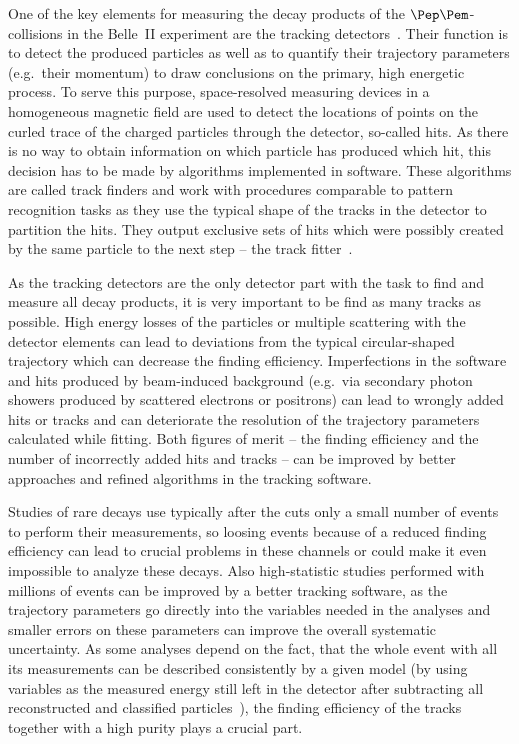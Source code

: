 One of the key elements for measuring the decay products of the $\Pep\Pem$-collisions in the Belle~II experiment are the tracking detectors~\cite{tdr}. Their function is to detect the produced particles as well as to quantify their trajectory parameters (e.g.\ their momentum) to draw conclusions on the primary, high energetic process. To serve this purpose, space-resolved measuring devices in a homogeneous magnetic field are used to detect the locations of points on the curled trace of the charged particles through the detector, so-called hits. As there is no way to obtain information on which particle has produced which hit, this decision has to be made by algorithms implemented in software. These algorithms are called track finders and work with procedures comparable to pattern recognition tasks as they use the typical shape of the tracks in the detector to partition the hits. They output exclusive sets of hits which were possibly created by the same particle to the next step -- the track fitter~\cite{genfit}. 

As the tracking detectors are the only detector part with the task to find and measure all decay products, it is very important to be find as many tracks as possible. High energy losses of the particles or multiple scattering with the detector elements can lead to deviations from the typical circular-shaped trajectory which can decrease the finding efficiency. Imperfections in the software and hits produced by beam-induced background (e.g.\ via secondary photon showers produced by scattered electrons or positrons) can lead to wrongly added hits or tracks and can deteriorate the resolution of the trajectory parameters calculated while fitting. Both figures of merit -- the finding efficiency and the number of incorrectly added hits and tracks -- can be improved by better approaches and refined algorithms in the tracking software.

Studies of rare decays use typically after the cuts only a small number of events~\cite{lutz} to perform their measurements, so loosing events because of a reduced finding efficiency can lead to crucial problems in these channels or could make it even impossible to analyze these decays. Also high-statistic studies performed with millions of events can be improved by a better tracking software, as the trajectory parameters go directly into the variables needed in the analyses and smaller errors on these parameters can improve the overall systematic uncertainty. As some analyses depend on the fact, that the whole event with all its measurements can be described consistently by a given model (by using variables as the measured energy still left in the detector after subtracting all reconstructed and classified particles~\cite{christian_phd}), the finding efficiency of the tracks together with a high purity plays a crucial part.

